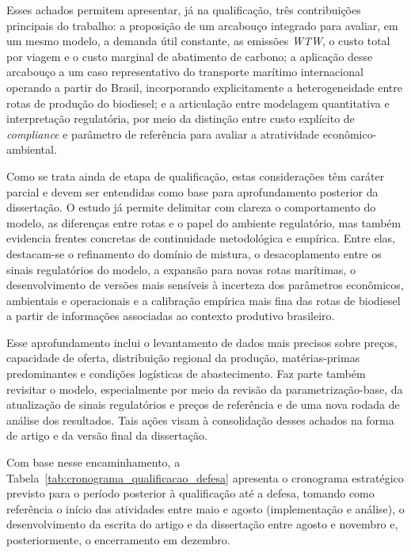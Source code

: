 Esses achados permitem apresentar, já na qualificação, três contribuições principais do trabalho: a proposição de um arcabouço integrado para avaliar, em um mesmo modelo, a demanda útil constante, as emissões \emph{WTW}, o custo total por viagem e o custo marginal de abatimento de carbono; a aplicação desse arcabouço a um caso representativo do transporte marítimo internacional operando a partir do Brasil, incorporando explicitamente a heterogeneidade entre rotas de produção do biodiesel; e a articulação entre modelagem quantitativa e interpretação regulatória, por meio da distinção entre custo explícito de \emph{compliance} e parâmetro de referência para avaliar a atratividade econômico-ambiental.

Como se trata ainda de etapa de qualificação, estas considerações têm caráter parcial e devem ser entendidas como base para aprofundamento posterior da dissertação. O estudo já permite delimitar com clareza o comportamento do modelo, as diferenças entre rotas e o papel do ambiente regulatório, mas também evidencia frentes concretas de continuidade metodológica e empírica. Entre elas, destacam-se o refinamento do domínio de mistura, o desacoplamento entre os sinais regulatórios do modelo, a expansão para novas rotas marítimas, o desenvolvimento de versões mais sensíveis à incerteza dos parâmetros econômicos, ambientais e operacionais e a calibração empírica mais fina das rotas de biodiesel a partir de informações associadas ao contexto produtivo brasileiro. 

Esse aprofundamento inclui o levantamento de dados mais precisos sobre preços, capacidade de oferta, distribuição regional da produção, matérias-primas predominantes e condições logísticas de abastecimento. Faz parte também revisitar o modelo, especialmente por meio da revisão da parametrização-base, da atualização de sinais regulatórios e preços de referência e de uma nova rodada de análise dos resultados. Tais ações visam à consolidação desses achados na forma de artigo e da versão final da dissertação.

Com base nesse encaminhamento, a Tabela~\ref{tab:cronograma_qualificacao_defesa} apresenta o cronograma estratégico previsto para o período posterior à qualificação até a defesa, tomando como referência o início das atividades entre maio e agosto (implementação e análise), o desenvolvimento da escrita do artigo e da dissertação entre agosto e novembro e, posteriormente, o encerramento em dezembro.

